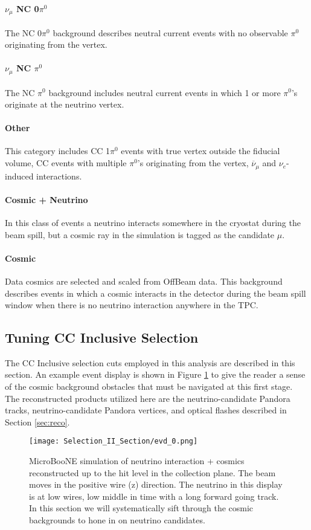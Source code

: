 \paragraph{  $\nu_\mu$ NC 0$\pi^0$}
The NC 0$\pi^0$ background describes neutral current events with no observable $\pi^0$ originating from the vertex.  

\paragraph{  $\nu_\mu$ NC $\pi^0$}
The NC $\pi^0$ background includes neutral current events in which 1 or more $\pi^0$'s originate at the neutrino vertex.  

\paragraph{ Other}
This category includes CC 1$\pi^0$ events with true vertex outside the fiducial volume, CC events with multiple $\pi^0$'s originating from the vertex, $\overline{\nu}_\mu$ and $\nu_e$-induced interactions. 

\paragraph{ Cosmic + Neutrino }
In this class of events a neutrino interacts somewhere in the cryostat during the beam spill, but a cosmic ray in the simulation is tagged as the candidate $\mu$. 

\paragraph{Cosmic }
Data cosmics are selected and scaled from OffBeam data.  This background describes events in which a cosmic interacts in the detector during the beam spill window when there is no neutrino interaction anywhere in the TPC.  

\subsection{Tuning CC Inclusive Selection}
The CC Inclusive selection cuts employed in this analysis are described in this section. An example event display is shown in Figure \ref{fig:evd_0} to give the reader a sense of the cosmic background obstacles that must be navigated at this first stage. The reconstructed products utilized here are the neutrino-candidate Pandora tracks, neutrino-candidate Pandora vertices, and optical flashes described in Section \ref{sec:reco}.  
\begin{figure}[H]
	\centering
    \texttt{[image: Selection\_II\_Section/evd\_0.png]}
\caption{ MicroBooNE simulation of neutrino interaction + cosmics reconstructed up to the hit level in the collection plane. The beam moves in the positive wire (z) direction.  The neutrino in this display is at low wires, low middle in time with a long forward going track. In this section we will systematically sift through the cosmic backgrounds to hone in on neutrino candidates.  }
\label{fig:evd_0}
\end{figure}


